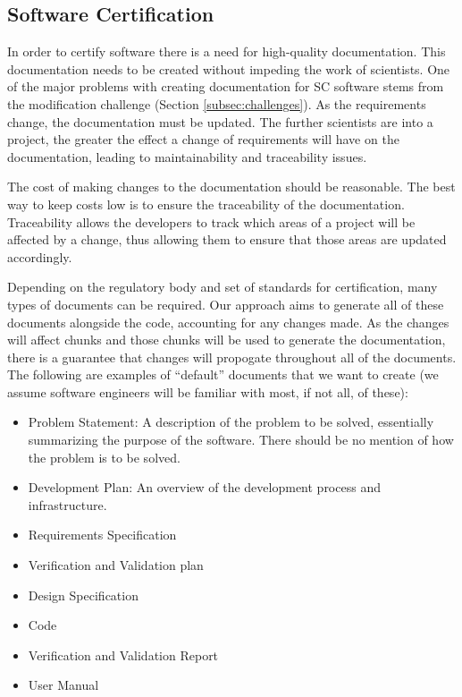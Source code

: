\documentclass[10pt, preprint]{sigplanconf}
\begin{document}


\subsection{Software Certification}
\label{subsec:software}

In order to certify software there is a need for high-quality documentation. This documentation needs to be created without impeding the work of scientists. One of the major problems with creating documentation for SC software stems from the modification challenge (Section \ref{subsec:challenges}). As the requirements change, the documentation must be updated. The further scientists are into a project, the greater the effect a change of requirements will have on the documentation, leading to maintainability and traceability issues.

The cost of making changes to the documentation should be reasonable. The best way to keep costs low is to ensure the traceability of the documentation. Traceability allows the developers to track which areas of a project will be affected by a change, thus allowing them to ensure that those areas are updated accordingly.

Depending on the regulatory body and set of standards for certification, many types of documents can be required. Our approach aims to generate all of these documents alongside the code, accounting for any changes made. As the changes will affect chunks and those chunks will be used to generate the documentation, there is a guarantee that changes will propogate throughout all of the documents. The following are examples of ``default'' documents that we want to create (we assume software engineers will be familiar with most, if not all, of these):

\begin{itemize}
\item Problem Statement: A description of the problem to be solved, essentially summarizing the purpose of the software. There should be no mention of how the problem is to be solved.
\item Development Plan: An overview of the development process and infrastructure.
\item Requirements Specification
\item Verification and Validation plan
\item Design Specification
\item Code
\item Verification and Validation Report
\item User Manual
\end{itemize}
\end{document}
